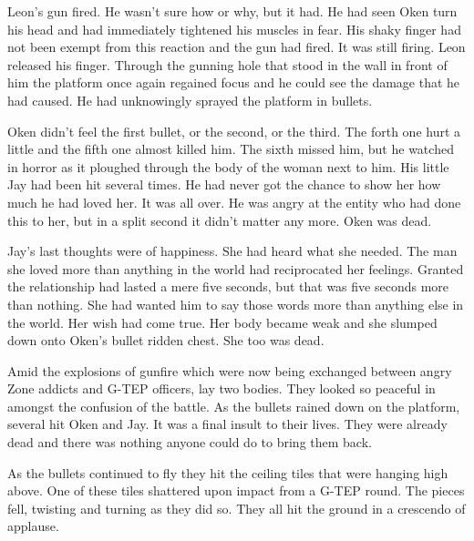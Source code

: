 \thoughtbreak



Leon's gun fired.  He wasn't sure how or why, but it had.  He had seen Oken turn his head and had immediately tightened his muscles in fear.  His shaky finger had not been exempt from this reaction and the gun had fired.  It was still firing.  Leon released his finger.  Through the gunning hole that stood in the wall in front of him the platform once again regained focus and he could see the damage that he had caused.  He had unknowingly sprayed the platform in bullets.



\thoughtbreak



Oken didn't feel the first bullet, or the second, or the third.  The forth one hurt a little and the fifth one almost killed him.  The sixth missed him, but he watched in horror as it ploughed through the body of the woman next to him.  His little Jay had been hit several times.  He had never got the chance to show her how much he had loved her.  It was all over.  He was angry at the entity who had done this to her, but in a split second it didn't matter any more.  Oken was dead.

Jay's last thoughts were of happiness.  She had heard what she needed.  The man she loved more than anything in the world had reciprocated her feelings.  Granted the relationship had lasted a mere five seconds, but that was five seconds more than nothing.  She had wanted him to say those words more than anything else in the world.  Her wish had come true.  Her body became weak and she slumped down onto Oken's bullet ridden chest.  She too was dead.

Amid the explosions of gunfire which were now being exchanged between angry Zone addicts and G-TEP officers, lay two bodies.  They looked so peaceful in amongst the confusion of the battle.  As the bullets rained down on the platform, several hit Oken and Jay.  It was a final insult to their lives.  They were already dead and there was nothing anyone could do to bring them back.

As the bullets continued to fly they hit the ceiling tiles that were hanging high above.  One of these tiles shattered upon impact from a G-TEP round.  The pieces fell, twisting and turning as they did so.  They all hit the ground in a crescendo of applause. 



